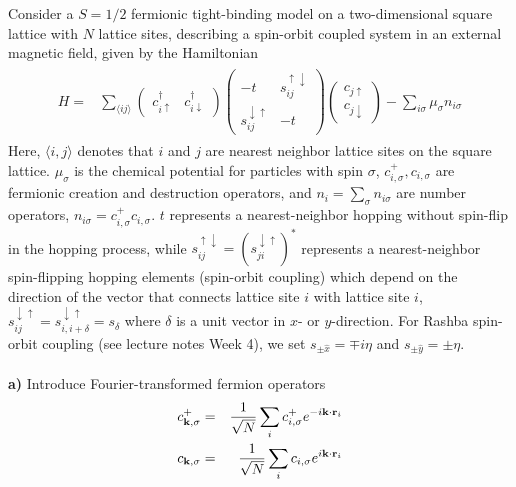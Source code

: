 \begin{problem}
	
	
	Consider a $S=1/2$ fermionic  tight-binding model on a two-dimensional square lattice with $N$ lattice sites, describing a spin-orbit coupled system in an external magnetic field, given by the Hamiltonian 
	\begin{align}
		\begin{split}
			H =&   \sum_{\langle ij \rangle} 
			\begin{pmatrix} c_{i\uparrow}^\dagger & c_{i\downarrow}^\dagger  \end{pmatrix}
			\begin{pmatrix} -t & s_{ij}^{\uparrow\downarrow} \\ s_{ij}^{\downarrow\uparrow} & -t \end{pmatrix}  
			\begin{pmatrix} c_{j\uparrow} \\ c_{j\downarrow}  \end{pmatrix}
			- \sum_{i \sigma} \mu_\sigma n_{i\sigma} \nonumber 
		\end{split}
	\end{align}
	Here,  $\langle i,j \rangle$ denotes that $i$ and $j$ are nearest neighbor lattice sites on the square lattice. $\mu_{\sigma}$ is the chemical potential for particles with spin $\sigma$, $c^{+}_{i,\sigma}, c_{i,\sigma}$ are fermionic creation and destruction 
	operators, and $n_i = \sum_{\sigma} n_{i \sigma}$ are number operators, $n_{i \sigma} = c^{+}_{i,\sigma} c_{i,\sigma}$. $t$ represents a nearest-neighbor hopping without spin-flip in the hopping process, 
	while $ s_{ij}^{\uparrow\downarrow} = (s_{ji}^{\downarrow\uparrow} )^*$ represents a nearest-neighbor spin-flipping hopping elements (spin-orbit coupling) which depend on the direction of the vector that connects lattice site $i$ with lattice site $i$, 
	$s_{ij}^{\downarrow\uparrow} =s_{i, i+\delta}^{\downarrow\uparrow} = s_{\delta} $ where $\delta$ is a unit vector in $x$- or $y$-direction.  For Rashba spin-orbit coupling (see lecture notes Week 4), we set $s_{\pm \hat{ x}} = \mp i \eta$ 
	and $s_{\pm \hat{y}}= \pm \eta$. 
	\ \\
	\ \\
	{\bf a)} Introduce Fourier-transformed fermion operators 
	\begin{eqnarray}
		c^{+}_{{\bf k},\sigma} & = & \frac{1}{\sqrt{N}} \sum_i c^{+}_{i,\sigma} e^{-i {\bf k} \cdot {\bf r}_i} \nonumber \\
		c_{{\bf k},\sigma} & = & \frac{1}{\sqrt{N}} \sum_i c_{i,\sigma} e^{i {\bf k} \cdot {\bf r}_i} \nonumber

\end{eqnarray}
\end{problem}
